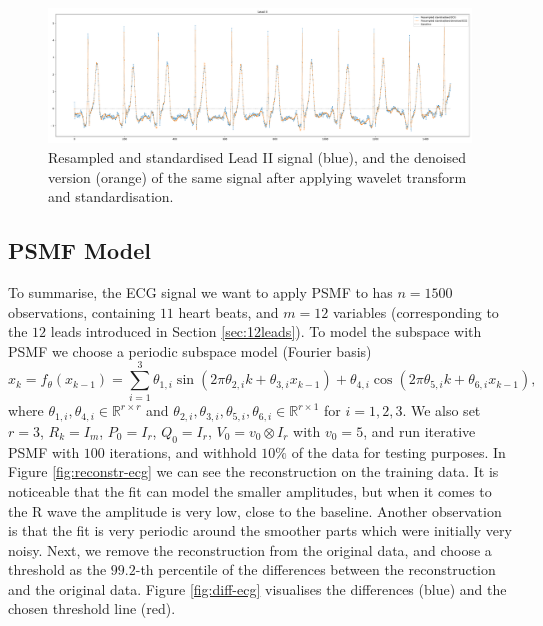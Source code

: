 \documentclass{mldsmsc}
\begin{document}
\begin{figure}[h]
\centering
\includegraphics[width=1\linewidth]{images/r_peaks/resampled_standardised_denoised_ecg_m.pdf}
\caption{Resampled and standardised Lead II signal (blue), and the denoised version (orange) of the same signal after applying wavelet transform and standardisation.}
\label{fig:res-st-den-ecg}
\end{figure}

\subsection{PSMF Model}

To summarise, the ECG signal we want to apply PSMF to has $n = 1500$ observations, containing $11$ heart beats, and $m = 12$ variables (corresponding to the $12$ leads introduced in Section \ref{sec:12leads}). To model the subspace with PSMF we choose a periodic subspace model (Fourier basis)
\begin{equation}
    x_k = f_{\theta}(x_{k-1}) = \sum_{i=1}^3 \theta_{1,i} \sin(2\pi \theta_{2,i} k + \theta_{3,i} x_{k-1}) + \theta_{4,i} \cos(2\pi \theta_{5,i} k + \theta_{6,i} x_{k-1}),
\end{equation}
where $\theta_{1,i}, \theta_{4,i} \in \mathbb{R}^{r \times r}$ and $\theta_{2,i}, \theta_{3,i}, \theta_{5,i}, \theta_{6,i} \in \mathbb{R}^{r \times 1}$ for $i = 1, 2, 3$. We also set $r = 3$, $R_k = I_m$, $P_0 = I_r$, $Q_0 = I_r$, $V_0 = v_0 \otimes I_r$ with $v_0 = 5$, and run iterative PSMF with $100$ iterations, and withhold $10\%$ of the data for testing purposes. In Figure \ref{fig:reconstr-ecg} we can see the reconstruction on the training data. It is noticeable that the fit can model the smaller amplitudes, but when it comes to the R wave the amplitude is very low, close to the baseline. Another observation is that the fit is very periodic around the smoother parts which were initially very noisy. Next, we remove the reconstruction from the original data, and choose a threshold as the $99.2$-th percentile of the differences between the reconstruction and the original data. Figure \ref{fig:diff-ecg} visualises the differences (blue) and the chosen threshold line (red). \newline
\end{document}
